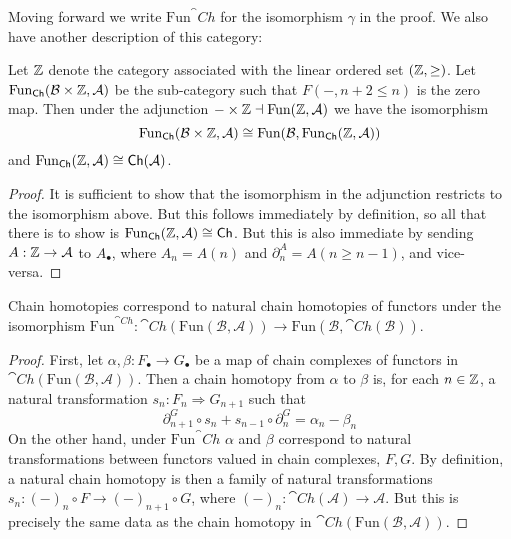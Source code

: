 Moving forward we write $\text{Fun}^\cat{Ch}$ for the isomorphism $\gamma$ in the proof. We also have another description of this category:

\begin{lem}[label=lem:adjChFuncCat]
    Let $\mathbb Z$ denote the category associated with the linear ordered set $(\mathbb Z,\geq)$. Let $\text{Fun}_{\textup{\textsf{Ch}}}(\mathcal{B}\times \mathbb Z,\mathcal{A})$ be the sub-category such that $F(-,n+2\leq n)$ is the zero map. Then under the adjunction $-\times \mathbb Z\dashv \text{Fun}(\mathbb Z,\mathcal{A})$ we have the isomorphism
    \begin{equation*}
        \text{Fun}_{\textup{\textsf{Ch}}}(\mathcal{B}\times \mathbb Z,\mathcal{A})\cong \text{Fun}(\mathcal{B},\text{Fun}_{\textup{\textsf{Ch}}}(\mathbb Z,\mathcal{A}))
    \end{equation*}
    and $\text{Fun}_{\textup{\textsf{Ch}}}(\mathbb Z,\mathcal{A})\cong \textup{\textsf{Ch}}(\mathcal{A})$.
\end{lem}
\begin{proof}
    It is sufficient to show that the isomorphism in the adjunction restricts to the isomorphism above. But this follows immediately by definition, so all that there is to show is $\text{Fun}_{\textup{\textsf{Ch}}}(\mathbb Z,\mathcal{A})\cong \textup{\textsf{Ch}}$. But this is also immediate by sending $A:\mathbb Z\to \mathcal{A}$ to $A_\bullet$, where $A_n = A(n)$ and $\partial_n^A = A(n\geq n-1)$, and vice-versa.
\end{proof}

\begin{lem}[label=lem:natHomotopIsChainFunctHomotop]
    Chain homotopies correspond to natural chain homotopies of functors under the isomorphism $\text{Fun}^{\cat{Ch}}:\cat{Ch}(\text{Fun}(\mathcal{B},\mathcal{A}))\to \text{Fun}(\mathcal{B},\cat{Ch}(\mathcal{B}))$.
\end{lem}
\begin{proof}
    First, let $\alpha,\beta:F_\bullet\to G_\bullet$ be a map of chain complexes of functors in $\cat{Ch}(\text{Fun}(\mathcal{B},\mathcal{A}))$. Then a chain homotopy from $\alpha$ to $\beta$ is, for each $n \in \mathbb Z$, a natural transformation $s_n:F_n\Rightarrow G_{n+1}$ such that 
    \begin{equation*}
        \partial_{n+1}^G\circ s_n + s_{n-1}\circ \partial_n^G = \alpha_n-\beta_n
    \end{equation*}
    On the other hand, under $\text{Fun}^\cat{Ch}$ $\alpha$ and $\beta$ correspond to natural transformations between functors valued in chain complexes, $F,G$. By definition, a natural chain homotopy is then a family of natural transformations $s_n: (-)_n\circ F\to (-)_{n+1}\circ G$, where $(-)_n:\cat{Ch}(\mathcal{A})\to \mathcal{A}$. But this is precisely the same data as the chain homotopy in $\cat{Ch}(\text{Fun}(\mathcal{B},\mathcal{A}))$.
\end{proof}

